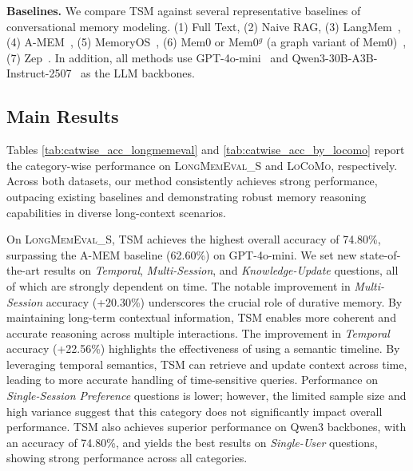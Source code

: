 \documentclass[11pt]{article}
\newcommand{\ours}[1]{TSM}
\begin{document}
\noindent \textbf{Baselines.} We compare \ours{} against several representative baselines of conversational memory
modeling. (1) Full Text, (2) Naive RAG, (3) LangMem~\cite{langchain_langchain_nodate}, (4) A-MEM~\cite{xu2025mem}, (5) MemoryOS~\citep{kang_memory_nodate}, 
(6) Mem0 or Mem0$^g$ (a graph variant of Mem0)~\citep{chhikara2025mem0}, (7) Zep~\citep{rasmussen_zep_2025}. In addition, all methods use GPT-4o-mini~\cite{openai_gpt-4o_2024} and Qwen3-30B-A3B-Instruct-2507~\cite{qwen3technicalreport} as the LLM backbones. %

\subsection{Main Results}


Tables \ref{tab:catwise_acc_longmemeval} and \ref{tab:catwise_acc_by_locomo} report the category-wise performance on \textsc{LongMemEval\_S} and \textsc{LoCoMo}, respectively. Across both datasets, our method consistently achieves strong performance, outpacing existing baselines and demonstrating robust memory reasoning capabilities in diverse long-context scenarios.

 On \textsc{LongMemEval\_S}, \ours{} achieves the highest overall accuracy of 74.80\%, surpassing the A-MEM baseline (62.60\%) on GPT-4o-mini. We set new state-of-the-art results on \textit{Temporal}, \textit{Multi-Session}, and \textit{Knowledge-Update} questions, all of which are strongly dependent on time. The notable improvement in \textit{Multi-Session} accuracy (+20.30\%) underscores the crucial role of durative memory. By maintaining long-term contextual information, \ours{} enables more coherent and accurate reasoning across multiple interactions. The improvement in \textit{Temporal} accuracy (+22.56\%) highlights the effectiveness of using a semantic timeline. By leveraging temporal semantics, \ours{} can retrieve and update context across time, leading to more accurate handling of time-sensitive queries.
Performance on \textit{Single-Session Preference} questions is lower; however, the limited sample size and high variance suggest that this category does not significantly impact overall performance.
\ours{} also achieves superior performance on Qwen3 backbones, with an accuracy of 74.80\%, and yields the best results on \textit{Single-User} questions, showing strong performance across all categories.
\end{document}
